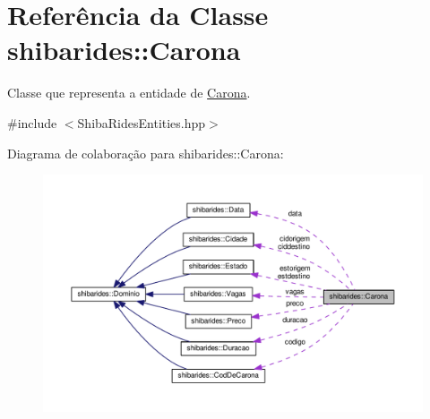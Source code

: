\hypertarget{classshibarides_1_1Carona}{}\section{Referência da Classe shibarides\+:\+:Carona}
\label{classshibarides_1_1Carona}


Classe que representa a entidade de \hyperlink{classshibarides_1_1Carona}{Carona}.  




{\ttfamily \#include $<$Shiba\+Rides\+Entities.\+hpp$>$}



Diagrama de colaboração para shibarides\+:\+:Carona\+:\nopagebreak
\begin{figure}[H]
\begin{center}
\leavevmode
\includegraphics[width=350pt]{classshibarides_1_1Carona__coll__graph}
\end{center}
\end{figure}
